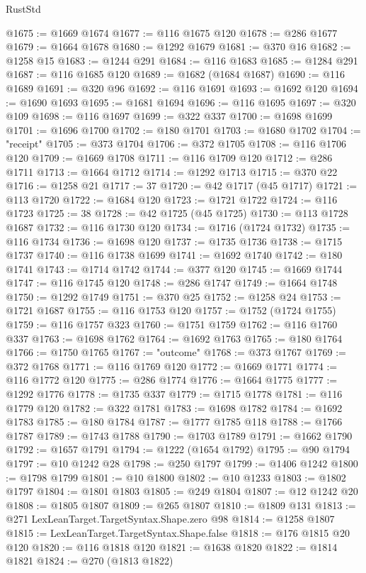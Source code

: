 \begin{lexlean}{RustStd}
\begin{coremodule}
@1675 := @1669 @1674
@1677 := @116 @1675 @120
@1678 := @286 @1677
@1679 := @1664 @1678
@1680 := @1292 @1679
@1681 := @370 @16
@1682 := @1258 @15
@1683 := @1244 @291
@1684 := @116 @1683
@1685 := @1284 @291
@1687 := @116 @1685 @120
@1689 := @1682 (@1684 @1687)
@1690 := @116 @1689
@1691 := @320 @96
@1692 := @116 @1691
@1693 := @1692 @120
@1694 := @1690 @1693
@1695 := @1681 @1694
@1696 := @116 @1695
@1697 := @320 @109
@1698 := @116 @1697
@1699 := @322 @337
@1700 := @1698 @1699
@1701 := @1696 @1700
@1702 := @180 @1701
@1703 := @1680 @1702
@1704 := "receipt"
@1705 := @373 @1704
@1706 := @372 @1705
@1708 := @116 @1706 @120
@1709 := @1669 @1708
@1711 := @116 @1709 @120
@1712 := @286 @1711
@1713 := @1664 @1712
@1714 := @1292 @1713
@1715 := @370 @22
@1716 := @1258 @21
@1717 := 37
@1720 := @42 @1717 (@45 @1717)
@1721 := @113 @1720
@1722 := @1684 @120
@1723 := @1721 @1722
@1724 := @116 @1723
@1725 := 38
@1728 := @42 @1725 (@45 @1725)
@1730 := @113 @1728 @1687
@1732 := @116 @1730 @120
@1734 := @1716 (@1724 @1732)
@1735 := @116 @1734
@1736 := @1698 @120
@1737 := @1735 @1736
@1738 := @1715 @1737
@1740 := @116 @1738 @1699
@1741 := @1692 @1740
@1742 := @180 @1741
@1743 := @1714 @1742
@1744 := @377 @120
@1745 := @1669 @1744
@1747 := @116 @1745 @120
@1748 := @286 @1747
@1749 := @1664 @1748
@1750 := @1292 @1749
@1751 := @370 @25
@1752 := @1258 @24
@1753 := @1721 @1687
@1755 := @116 @1753 @120
@1757 := @1752 (@1724 @1755)
@1759 := @116 @1757 @323
@1760 := @1751 @1759
@1762 := @116 @1760 @337
@1763 := @1698 @1762
@1764 := @1692 @1763
@1765 := @180 @1764
@1766 := @1750 @1765
@1767 := "outcome"
@1768 := @373 @1767
@1769 := @372 @1768
@1771 := @116 @1769 @120
@1772 := @1669 @1771
@1774 := @116 @1772 @120
@1775 := @286 @1774
@1776 := @1664 @1775
@1777 := @1292 @1776
@1778 := @1735 @337
@1779 := @1715 @1778
@1781 := @116 @1779 @120
@1782 := @322 @1781
@1783 := @1698 @1782
@1784 := @1692 @1783
@1785 := @180 @1784
@1787 := @1777 @1785 @118
@1788 := @1766 @1787
@1789 := @1743 @1788
@1790 := @1703 @1789
@1791 := @1662 @1790
@1792 := @1657 @1791
@1794 := @1222 (@1654 @1792)
@1795 := @90 @1794
@1797 := @10 @1242 @28
@1798 := @250 @1797
@1799 := @1406 @1242
@1800 := @1798 @1799
@1801 := @10 @1800
@1802 := @10 @1233
@1803 := @1802 @1797
@1804 := @1801 @1803
@1805 := @249 @1804
@1807 := @12 @1242 @20
@1808 := @1805 @1807
@1809 := @265 @1807
@1810 := @1809 @131
@1813 := @271 LexLeanTarget.TargetSyntax.Shape.zero @98
@1814 := @1258 @1807
@1815 := LexLeanTarget.TargetSyntax.Shape.false
@1818 := @176 @1815 @20 @120
@1820 := @116 @1818 @120
@1821 := @1638 @1820
@1822 := @1814 @1821
@1824 := @270 (@1813 @1822)

\end{coremodule}
\end{lexlean}
